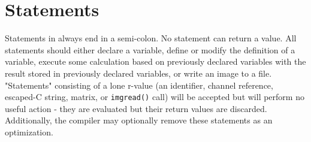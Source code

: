 \section{Statements}
\label{sec:statements}

Statements in \sys{} always end in a semi-colon. No statement
can return a value. All statements should either declare a variable,
define or modify the definition of a variable, execute
some calculation based on previously declared variables with
the result stored in previously declared variables, or write an image to a file.
"Statements" consisting of a lone r-value (an identifier,
channel reference, escaped-C string, matrix, or \texttt{imgread()} call)
will be accepted but will perform no useful action - they are evaluated but
their return values are discarded. Additionally, the \sys{} compiler may
optionally remove these statements as an optimization.
